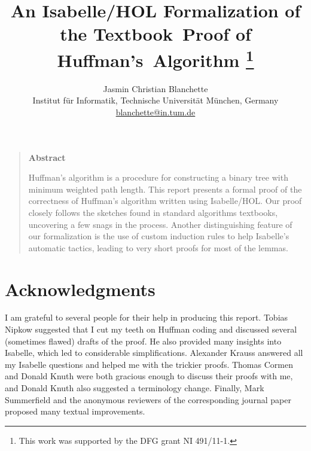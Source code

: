 \documentclass[11pt,a4paper]{article}
\begin{document}
\title{An Isabelle/HOL Formalization of the Textbook~Proof of
       Huffman's~Algorithm%
\thanks{This work was supported by the DFG grant NI 491/11-1.}}

\author{Jasmin Christian Blanchette \\ \small
Institut f\"ur Informatik, Technische Universit\"at M\"unchen, Germany \\[-.2ex] \small
\url{blanchette@in.tum.de}}

\maketitle

\begin{quote}
\begin{center}{\bf\large Abstract}\end{center}

\smallskip

Huffman's algorithm is a procedure for constructing a binary tree with minimum
weighted path length. This report presents a formal proof of the correctness of
Huffman's algorithm written using Isabelle/HOL. Our proof closely follows the
sketches found in standard algorithms textbooks, uncovering a few snags in the
process. Another distinguishing feature of our formalization is the use of
custom induction rules to help Isabelle's automatic tactics, leading to very
short proofs for most of the lemmas.
\end{quote}

\vskip0pt

\tableofcontents



\section*{Acknowledgments}

I am grateful to several people for their help in producing this report. Tobias
Nipkow suggested that I cut my teeth on Huffman coding and discussed several
(sometimes flawed) drafts of the proof. He also provided many insights into
Isabelle, which led to considerable simplifications. Alexander Krauss answered
all my Isabelle questions and helped me with the trickier proofs. Thomas Cormen
and Donald Knuth were both gracious enough to discuss their proofs with me, and
Donald Knuth also suggested a terminology change. Finally, Mark Summerfield and
the anonymous reviewers of the corresponding journal paper proposed many textual
improvements.
\end{document}
